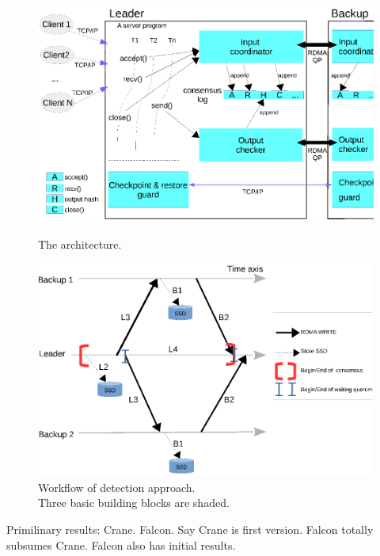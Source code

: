 \begin{figure}[!htb]
    \begin{minipage}{.49\textwidth}
        \includegraphics[width=0.34\textheight]{figures/arch.ps}
        \vspace{0.1in}
        \caption{The \falcon architecture.}
        \label{fig:falcon-arch}
    \end{minipage}
    \begin{minipage}{0.51\textwidth}
        \includegraphics[width=0.34\textheight]{figures/consensus.ps}
        \vspace{0.1in}
        \caption{Workflow of detection approach. \\Three basic building blocks
are shaded.}
        \label{fig:falcon-protocol}
    \end{minipage}
\end{figure}

Primilinary results: Crane. Falcon. Say Crane is first version. Falcon totally 
subsumes Crane. Falcon also has initial results.

